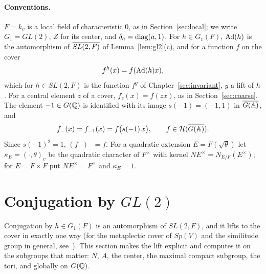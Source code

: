 \paragraph{Conventions.} $F=k_v$ is a local field of characteristic $0$,
as in Section~\ref{sec:local}; we write $G_1=GL(2)$, $Z$ for its center,
and $\delta_a=\operatorname{diag}(a,1)$. For $h\in G_1(F)$, $\operatorname{Ad}(h)$ is the
automorphism of $\overline{SL(2,F)}$ of Lemma~\ref{lem:gl2}(c), and for a function $f$
on the cover
\[
f^h(x)=f(\operatorname{Ad}(h)x),
\]
which for $h\in SL(2,F)$ is the function $f^y$ of
Chapter~\ref{sec:invariant}, $y$ a lift of $h$. For a central element
$z$ of a cover, $f_z(x)=f(zx)$, as in Section~\ref{sec:coarse}. The
element $-1\in G(\mathbb{Q})$ is identified with its image $s(-1)=(-1,1)$ in
$\overline{G(\mathbb{A})}$, and
\[
f_-(x)=f_{-1}(x)=f\bigl(s(-1)\,x\bigr),\qquad f\in\mathcal H(\overline{G(\mathbb{A})}).
\]
Since $s(-1)^2=1$, $(f_-)_-=f$. For a quadratic extension $E=F(\sqrt\theta)$
let $\kappa_E=(\cdot,\theta)_v$ be the quadratic character of $F^\times$
with kernel $N E^\times=N_{E/F}(E^\times)$; for $E=F\times F$ put
$N E^\times=F^\times$ and $\kappa_E=1$.

\section{Conjugation by \texorpdfstring{$GL(2)$}{GL(2)}}\label{sec:Ad}

Conjugation by $h\in G_1(F)$ is an automorphism of $SL(2,F)$, and it
lifts to the cover in exactly one way (for the metaplectic cover of
$Sp(V)$ and the similitude group in general, see~\cite[\S3]{Th13}). This section makes the lift
explicit and computes it on the subgroups that matter: $N$, $A$, the
center, the maximal compact subgroup, the tori, and globally on $G(\mathbb{Q})$.

